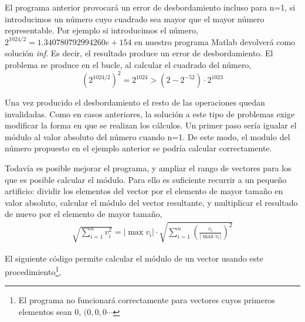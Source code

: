 El programa anterior provocará un error de desbordamiento incluso para n=1, si introducimos un número cuyo cuadrado sea mayor que el mayor número representable. Por ejemplo si introducimos el número, $ 2^{1024/2}=1.340780792994260e+154$ en nuestro programa Matlab devolverá como solución \emph{inf}. Es decir, el resultado produce un error de desbordamiento. El problema se produce en el bucle, al calcular el cuadrado del número,
\begin{equation*}
\left(2^{1024/2}\right)^2=2^{1024}> (2-2^{-52})\cdot 2^{1023}
\end{equation*}

Una vez producido el desbordamiento el resto de las operaciones quedan invalidadas. Como en casos anteriores, la solución a este tipo de problemas exige modificar la forma en que se realizan los cálculos. Un primer paso sería igualar el módulo al valor absoluto del número cuando n=1. De este modo, el modulo del número propuesto en el ejemplo anterior se podría calcular correctamente.

Todavía es posible mejorar el programa, y ampliar el rango de vectores para los que es posible calcular el módulo. Para ello es suficiente recurrir a un pequeño artificio: dividir los elementos del vector por el elemento de mayor tamaño en valor absoluto, calcular el módulo del vector resultante, y multiplicar el resultado de nuevo por el elemento de mayor tamaño,
\begin{align*}
\sqrt{\sum_{i=1}^nv_i^2}=\vert\max{v_i}\vert\cdot\sqrt{\sum_{i=1}^n\left(\frac{v_i}{\vert\max{v_i}\vert}\right)^2}
\end{align*}

El siguiente código permite calcular el módulo de un vector usando este procedimiento\footnote{El programa no funcionará correctamente para vectores cuyos primeros elementos sean 0, $(0,0,0\cdots$},

